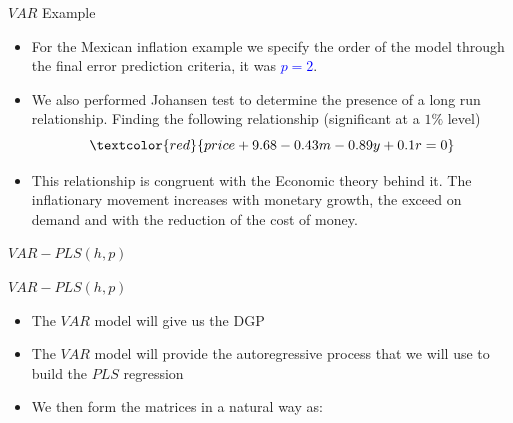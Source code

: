 \documentclass{beamer}
\newcommand{\?}{?`}
\begin{document}
\begin{frame}{$VAR$ Example}
  \begin{itemize}
  \item For the Mexican inflation example we specify the order of the model through the final error prediction criteria,
  it was \textcolor{blue}{$p=2$}.
  \item We also performed  Johansen test to determine the presence of a long run relationship.
  Finding the following relationship (significant at a $1\%$ level)
      \begin{displaymath}
     \textcolor{red} {price+9.68-0.43m-0.89y+0.1r=0}
    \end{displaymath}
  \item This relationship is congruent with the Economic theory behind it.
  The inflationary movement increases with monetary growth, the exceed on demand and with the reduction of the cost of money.

  \end{itemize}
\end{frame}




\begin{frame}{}
  \begin{block}{}
    \begin{center}
      \vspace{3mm}
      {\Large $VAR-PLS(h,p)$}
      \vspace{3mm}
    \end{center}
  \end{block}
\end{frame}


\begin{frame}{$VAR-PLS(h,p)$}
  \begin{itemize}
  \item The $VAR$ model will give us the DGP
  \bigskip
  \item The $VAR$ model will provide the autoregressive process that we will use to build the $PLS$ regression
  \bigskip
  \item We then form the matrices in a natural way as:
  \end{itemize}
\end{frame}
\end{document}
